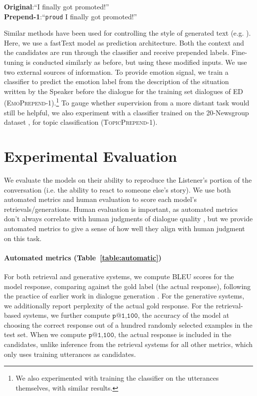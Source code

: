 \documentclass[11pt,a4paper]{article}
\begin{document}
{
\hspace*{.2in}\textbf{Original}:``I finally got promoted!'' \\
\hspace*{.2in} 
\textbf{Prepend-1}:``\texttt{proud} I finally got promoted!''
}

Similar methods have been used for 
controlling the style of generated text (e.g. \citealp{Politeness}). 
Here, we use a fastText model \citep{fasttext}
as prediction architecture.
Both the context and the candidates are run through the classifier
and receive prepended labels. Fine-tuning is conducted similarly as
before, but using these modified inputs.
We use two external sources of information.
To provide emotion signal, we train a classifier to predict the emotion label from the description of the situation written by the Speaker before the dialogue for the training set dialogues of ED (\textsc{EmoPrepend-1}).\footnote{We also experimented with training the classifier on the utterances themselves, with similar results.}
To gauge whether supervision from a more distant task
would still be helpful, we also experiment with a classifier trained on the 20-Newsgroup dataset \citep{joachims1996probabilistic}, for topic classification (\textsc{TopicPrepend-1}).






\section{Experimental Evaluation}

We evaluate the models on their ability to reproduce the Listener's portion of the conversation (i.e. the ability to react to someone else's story).  We use both automated metrics and human evaluation to score each model's retrievals/generations. Human evaluation is important, as automated metrics don't always correlate with human judgments of dialogue quality \citep{HowNotToEval}, but we provide automated metrics to give a sense of how well they
align with human judgment on this task.

\paragraph{Automated metrics (Table~\ref{table:automatic})} For both retrieval and generative systems, we compute BLEU scores \citep{papineni2002bleu} for the model response, comparing against the gold label (the actual response), following
the practice of earlier work in dialogue generation \citep{wen2015semantically,li2015diversity,li2016persona}.
For the generative systems, we additionally report perplexity of the actual gold response. 
For the retrieval-based systems, we further compute $\texttt{p@1,100}$, the accuracy of the model at choosing the correct response out of a hundred randomly selected examples in the test set.  When we compute $\texttt{p@1,100}$, the actual response is included in the candidates, unlike inference from the retrieval systems for all other metrics, which only uses training utterances as candidates.
\end{document}
